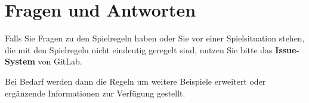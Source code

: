 \section*{Fragen und Antworten}
Falls Sie Fragen zu den Spielregeln haben oder Sie vor einer Spielsituation stehen, die mit den Spielregeln nicht eindeutig geregelt sind, nutzen Sie bitte das \textbf{Issue-System} von GitLab.

Bei Bedarf werden dann die Regeln um weitere Beispiele erweitert oder ergänzende Informationen zur Verfügung gestellt.
